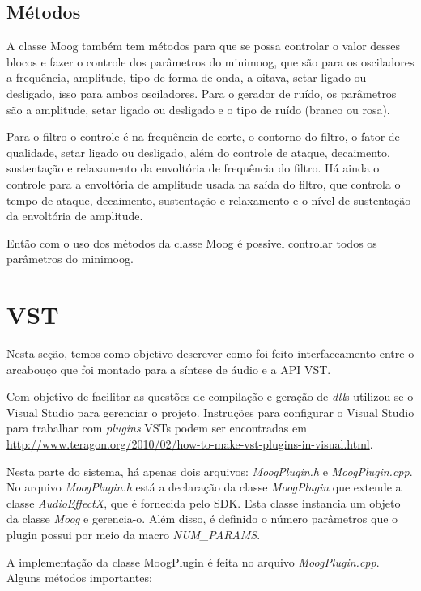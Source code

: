 \documentclass{article}
\begin{document}
  
\subsection{Métodos}
A classe Moog também tem métodos para que se possa controlar o valor desses blocos e fazer o controle dos parâmetros do minimoog, que são
 para os osciladores a frequência, amplitude, tipo de forma de onda, a oitava, setar ligado ou desligado, isso para ambos osciladores.
Para o gerador de ruído, os parâmetros são a amplitude, setar ligado ou desligado e o tipo de ruído (branco ou rosa).


Para o filtro o controle é na frequência de corte, o contorno do filtro, o fator de qualidade, setar ligado ou desligado, além do controle
 de ataque, decaimento, sustentação e relaxamento da envoltória de frequência do filtro.
Há ainda o controle para a envoltória de amplitude usada na saída do filtro, que controla o tempo de ataque, decaimento, sustentação e 
relaxamento e o nível de sustentação da envoltória de amplitude.


Então com o uso dos métodos da classe Moog é possivel controlar todos os parâmetros do minimoog.







\section{VST}
Nesta seção, temos como objetivo 
descrever como foi feito interfaceamento entre o arcabouço que foi montado 
para a síntese de áudio e a API VST.



Com objetivo de facilitar as questões de compilação e geração de \emph{dll}s 
utilizou-se o Visual Studio para gerenciar o projeto. Instruções para configurar 
o Visual Studio para trabalhar com \emph{plugins} VSTs podem ser encontradas em 
\url{http://www.teragon.org/2010/02/how-to-make-vst-plugins-in-visual.html}.

Nesta parte do sistema, há apenas dois arquivos: \emph{MoogPlugin.h} e \emph{MoogPlugin.cpp}.
No arquivo \emph{MoogPlugin.h} está a declaração da classe \emph{MoogPlugin} que 
extende a classe \emph{AudioEffectX}, que é fornecida pelo SDK. Esta classe instancia 
um objeto da classe \emph{Moog} e gerencia-o. Além disso, é 
definido o número parâmetros que o plugin possui por meio da macro \emph{NUM\_PARAMS}.

A implementação da classe MoogPlugin é feita no arquivo \emph{MoogPlugin.cpp}. Alguns 
métodos importantes:
\end{document}
